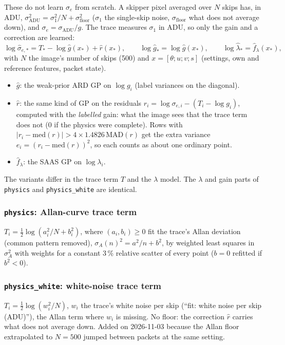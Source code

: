 These do not learn $\sigma_e$ from scratch. A skipper pixel averaged over $N$ skips has, in ADU,
$\sigma_{\text{ADU}}^2=\sigma_1^2/N+\sigma_{\text{floor}}^2$ ($\sigma_1$ the single-skip noise, $\sigma_{\text{floor}}$
what does not average down), and $\sigma_e=\sigma_{\text{ADU}}/g$. The trace measures $\sigma_1$ in ADU, so only the
gain and a correction are learned:
\[
\log\hat\sigma_{e,*}=T_*-\log\hat g(x_*)+\hat r(x_*),\qquad \log\hat g_*=\log\hat g(x_*),\qquad \log\hat\lambda_*=\hat f_\lambda(x_*),
\]
with $N$ the image's number of skips (500) and $x=[\theta;u;v;s]$ (settings, own and reference features, packet state).
\begin{itemize}
\item $\hat g$: the weak-prior ARD GP on $\log g_i$ (label variances on the diagonal).
\item $\hat r$: the same kind of GP on the residuals $r_i=\log\sigma_{e,i}-(T_i-\log g_i)$, computed with the
  \emph{labelled} gain: what the image sees that the trace term does not (0 if the physics were complete). Rows with
  $|r_i-\mathrm{med}(r)|>4\times1.4826\,\mathrm{MAD}(r)$ get the extra variance $e_i=(r_i-\mathrm{med}(r))^2$, so each counts
  as about one ordinary point.
\item $\hat f_\lambda$: the SAAS GP on $\log\lambda_i$.
\end{itemize}
The variants differ in the trace term $T$ and the $\lambda$ model. The $\lambda$ and gain parts of \texttt{physics} and
\texttt{physics\_white} are identical.

\subsubsection{\texttt{physics}: Allan-curve trace term}
$T_i=\tfrac12\log(a_i^2/N+b_i^2)$, where $(a_i,b_i)\ge0$ fit the trace's Allan deviation (common pattern removed),
$\sigma_A(n)^2=a^2/n+b^2$, by weighted least squares in $\sigma_A^2$ with weights for a constant 3\,\% relative scatter
of every point ($b=0$ refitted if $b^2<0$).


\subsubsection{\texttt{physics\_white}: white-noise trace term}
$T_i=\tfrac12\log(w_i^2/N)$, $w_i$ the trace's white noise per skip (``fit: white noise per skip (ADU)''), the Allan
term where $w_i$ is missing. No floor: the correction $\hat r$ carries what does not average down. Added on 2026-11-03
because the Allan floor extrapolated to $N=500$ jumped between packets at the same setting.



